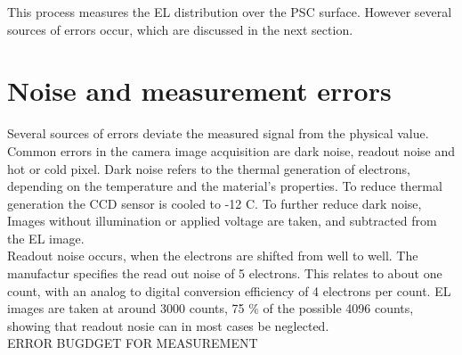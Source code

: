 This process measures the EL distribution over the PSC surface. However several sources of errors occur, which are discussed in the next section.
\FloatBarrier
\section{Noise and measurement errors}
Several sources of errors deviate the measured signal from the physical value. Common errors in the camera image acquisition are dark noise, readout noise and hot or cold pixel. Dark noise refers to the thermal generation of electrons, depending on the temperature and the material's properties. To reduce thermal generation the CCD sensor is cooled to -12 C. To further reduce dark noise, Images without illumination or applied voltage are taken, and subtracted from the EL image.\\

Readout noise occurs, when the electrons are shifted from well to well. The manufactur specifies the read out noise of 5 electrons. This relates to about one count, with an analog to digital conversion efficiency of 4 electrons per count.\cite{ManualSensicam} EL images are taken at around 3000 counts, 75 \% of the possible 4096 counts, showing that readout nosie can in most cases be neglected.\\
ERROR BUGDGET FOR MEASUREMENT\\ 
